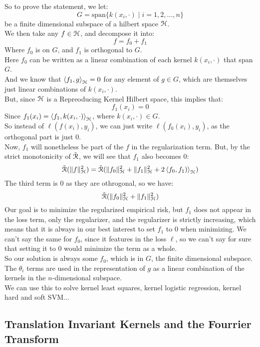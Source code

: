 \documentclass[12pt]{article}
\begin{document}
So to prove the statement,
we let:
\[ G = \text{span}\{k(x_i, \cdot) 
\mid i = 1, 2, \dots, n\}\] 
be a finite dimensional subspace of a hilbert 
space $\mathcal{H}$. \\
We then take any $f \in \mathcal{H}$,
and decompose it into:
\[ f = f_0 + f_1 \]
Where $f_0$ is on $G$, and $f_1$ is orthogonal
to $G$. \\
Here $f_0$ can be written as a linear combination
of each kernel $k(x_i, \cdot)$ that span $G$. \\
And we know that $\left\langle f_1, g \right\rangle_{\mathcal{H}} = 0$
for any element of $g \in G$, which are 
themselves just linear combinations of
$k(x_i, \cdot)$. \\
But, since $\mathcal{H}$ is a Repreoducing Kernel
Hilbert space, this implies that:
\[ f_1(x_i) = 0 \]
Since $f_1(x_i) = \left\langle f_1, k(x_i, \cdot) \right\rangle_{\mathcal{H}}$,
where $k(x_i, \cdot) \in G$. \\
So instead of $\ell(f(x_i), y_i)$,
we can just write $\ell(f_0(x_i), y_i)$,
as the orthogonal part is just $0$. \\
Now, $f_1$ will nonetheless be part of the $f$
in the regularization term. 
But, by the strict monotonicity of $\tilde{\mathcal{R}}$,
we will see that $f_1$
also becomes $0$:
\[ \tilde{\mathcal{R}}(\|f\|^2_{\mathcal{H}})
= \tilde{\mathcal{R}}(\|f_0\|^2_{\mathcal{H}}
+ \|f_1\|^2_{\mathcal{H}}
+ 2\left\langle f_0, f_1) \right\rangle_{\mathcal{H}}) \]
The third term is $0$ as they are othrogonal,
so we have:
\[ \tilde{\mathcal{R}}(\|f_0\|^2_{\mathcal{H}}
+ \|f_1\|^2_{\mathcal{H}}) \]
Our goal is to minimize the regularized
empirical risk, but $f_1$
does not appear in the loss term,
only the regularizer, and the regularizer
is strictly increasing, which means that
it is always in our best interest
to set $f_1$ to $0$
when minimizing.
We can't say the same for $f_0$,
since it features in the loss $\ell$,
so we can't say for sure that setting it to $0$
would minimize the term as a whole. \\

So our solution is always some $f_0$,
which is in $G$, the finite dimensional subspace. \\
The $\theta_i$ terms are used in the representation
of $g$ as a linear combination of the kernels 
in the $n$-dimensional subspace. \\

We can use this to solve kernel least 
squares, kernel logistic regression, kernel
hard and soft SVM... \\

\newpage

\subsection*{Translation Invariant Kernels
and the Fourrier Transform}
\end{document}
